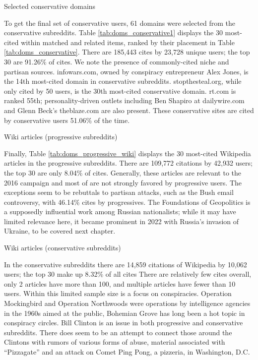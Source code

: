 \documentclass[doublespacing]{utdthesis}
\begin{document}
\begin{table}[!ht]
\centering
\caption{Selected conservative domains}

\label{tab:doms_conservative1}
\end{table}

To get the final set of conservative users, 61 domains were selected from the conservative subreddits.
Table \ref{tab:doms_conservative1} displays the 30 most-cited within matched and related items, ranked by their placement in Table \ref{tab:doms_conservative}.
There are 185,443 cites by 23,728 unique users; the top 30 are 91.26\% of cites.
We note the presence of commonly-cited niche and partisan sources.
infowars.com, owned by conspiracy entrepreneur Alex Jones, is the 14th most-cited domain in conservative subreddits.
stopthesteal.org, while only cited by 50 users, is the 30th most-cited conservative domain.
rt.com is ranked 55th; personality-driven outlets including Ben Shapiro at dailywire.com and Glenn Beck's theblaze.com are also present.
These conservative sites are cited by conservative users 51.06\% of the time.

\begin{table}[!ht]
\centering
\footnotesize
\caption{Wiki articles (progressive subreddits)}

\label{tab:doms_progressive_wiki}
\end{table}

Finally, Table \ref{tab:doms_progressive_wiki} displays the 30 most-cited Wikipedia articles in the progressive subreddits.
There are 109,772 citations by 42,932 users; the top 30 are only 8.04\% of cites.
Generally, these articles are relevant to the 2016 campaign and most of are not strongly favored by progressive users.
The exceptions seem to be rebuttals to partisan attacks, such as the Bush email controversy, with 46.14\% cites by progressives.
The Foundations of Geopolitics is a supposedly influential work among Russian nationalists; while it may have limited relevance here, it became prominent in 2022 with Russia's invasion of Ukraine, to be covered next chapter.

\begin{table}[!ht]
\centering
\footnotesize
\caption{Wiki articles (conservative subreddits)}

\label{tab:doms_conservative_wiki}
\end{table}

In the conservative subreddits there are 14,859 citations of Wikipedia by 10,062 users; the top 30 make up 8.32\% of all cites
There are relatively few cites overall, only 2 articles have more than 100, and multiple articles have fewer than 10 users.
Within this limited sample size is a focus on conspiracies.
Operation Mockingbird and Operation Northwoods were operations by intelligence agencies in the 1960s aimed at the public,
Bohemian Grove has long been a hot topic in conspiracy circles.
Bill Clinton is an issue in both progressive and conservative subreddits.
There does seem to be an attempt to connect those around the Clintons with rumors of various forms of abuse, material associated with ``Pizzagate'' and an attack on Comet Ping Pong, a pizzeria, in Washington, D.C.
\end{document}
